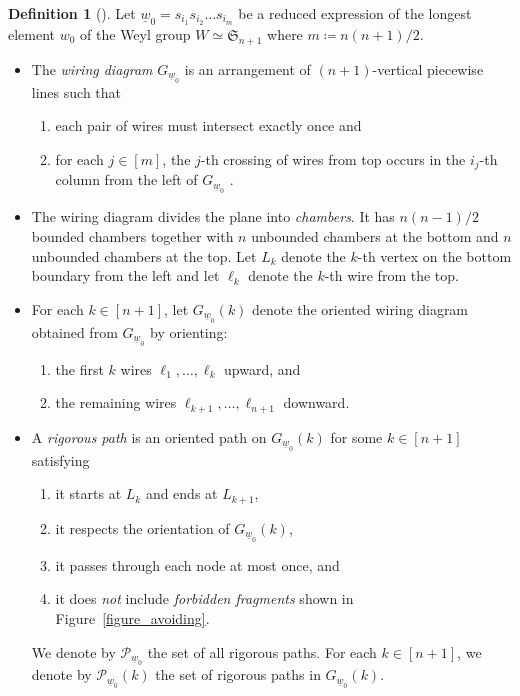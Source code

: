 \documentclass[11pt]{amsart}
\theoremstyle{plain}
\theoremstyle{definition}
\newtheorem{definition}[theorem]{Definition}
\theoremstyle{remark}
\numberwithin{equation}{section} \numberwithin{table}{section}
\numberwithin{equation}{section}
\begin{document}
\begin{definition}[{\cite[Section 5.1]{GP00}}]\label{definition_rigorous_path}
Let $\underline{w}_0 = s_{i_1}s_{i_2} \dots s_{i_m}$ be a reduced expression of the longest element $w_0$ of the Weyl group $W \simeq \mathfrak{S}_{n+1}$ where $m \coloneqq n(n+1)/2$. 

\begin{itemize}
\item The \emph{wiring diagram} ${G}_{\underline{w}_0}$ is an arrangement of $(n+1)$-vertical piecewise lines such that 
\begin{enumerate}
\item each pair of wires must intersect exactly once and 
\item for each $j \in [m]$, the $j$-th crossing of wires from top occurs in the $i_j$-th column from the left of ${G}_{\underline{w}_0}$ .
\end{enumerate}
\item The wiring diagram divides the plane into \emph{chambers}. It has $n(n-1)/2$ bounded chambers together with $n$ unbounded chambers at the bottom and $n$ unbounded chambers at the top. Let $L_k$ denote the $k$-th vertex on the bottom boundary from the left and let $\ell_k$ denote the $k$-th wire from the top.
\item For each $k \in [n+1]$, let $G_{\underline{w}_0}(k)$ denote the oriented wiring diagram obtained from $G_{\underline{w}_0}$ by orienting$\colon$
\begin{enumerate}
\item the first $k$ wires $\ell_1, \ldots, \ell_k$ upward, and 
\item the remaining wires $\ell_{k+1}, \ldots, \ell_{n+1}$ downward. 
\end{enumerate}
\item A \emph{rigorous path} is an oriented path on $G_{\underline{w}_0}(k)$ for some $k \in [n+1]$ satisfying
\begin{enumerate}
\item it starts at $L_k$ and ends at $L_{k+1}$, 
\item it respects the orientation of $G_{\underline{w}_0}(k)$,
\item it passes through each node at most once, and
\item it does \emph{not} include \emph{forbidden fragments} shown in Figure~\ref{figure_avoiding}.
\end{enumerate}
We denote by $\mathcal{P}_{\underline{w}_0}$ the set of all rigorous paths. For each $k \in [n+1]$, we denote by $\mathcal{P}_{\underline{w}_0}(k)$ the set of rigorous paths in $G_{\underline{w}_0}(k)$.
		

\end{itemize}
\end{definition}
\end{document}
